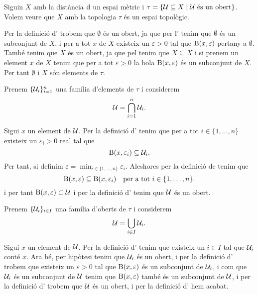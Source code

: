 \documentclass[../Apunts.tex]{subfiles}
\begin{document}
	\begin{example}
		\label{ex:topologia induida per una mètrica}
		Siguin \(X\) amb la distància \(\operatorname{d}\) un espai mètric i \(\tau=\{\mathcal{U}\subseteq X\mid \mathcal{U}\text{ és un obert}\}\). Volem veure que \(X\) amb la topologia \(\tau\) és un espai topològic.
		\begin{solution}
			Per la definició d' trobem que \(\emptyset\) és un obert, ja que per l' tenim que \(\emptyset\) és un subconjunt de \(X\), i per a tot \(x\) de \(X\) existeix un \(\varepsilon>0\) tal que \(\operatorname{B}(x,\varepsilon)\) pertany a \(\emptyset\). També tenim que \(X\) és un obert, ja que pel  tenim que \(X\subseteq X\) i si prenem un element \(x\) de \(X\) tenim que per a tot \(\varepsilon>0\) la bola \(\operatorname{B}(x,\varepsilon)\) és un subconjunt de \(X\). Per tant \(\emptyset\) i \(X\) són elements de \(\tau\).
			
			Prenem \(\{\mathcal{U}_{i}\}_{i=1}^{n}\) una família d'elements de \(\tau\) i considerem
			\[\mathcal{U}=\bigcap_{i=1}^{n}\mathcal{U}_{i}.\]
			
			Sigui \(x\) un element de \(\mathcal{U}\). Per la definició d' tenim que per a tot \(i\in\{1,\dots,n\}\) existeix un \(\varepsilon_{i}>0\) real tal que
			\[\operatorname{B}(x,\varepsilon_{i})\subseteq\mathcal{U}_{i}.\]
			Per tant, si definim \(\varepsilon=\min_{i\in\{1,\dots,n\}}\varepsilon_{i}\). Aleshores per la definició de  tenim que
			\[\operatorname{B}(x,\varepsilon)\subseteq\operatorname{B}(x,\varepsilon_{i})\quad\text{per a tot }i\in\{1,\dots,n\}.\]
			i per tant \(\operatorname{B}(x,\varepsilon)\subset\mathcal{U}\) i per la definició d' tenim que \(\mathcal{U}\) és un obert.
			
			Prenem \(\{\mathcal{U}_{i}\}_{i\in I}\) una família d'oberts de \(\tau\) i considerem
			\[\mathcal{U}=\bigcup_{i\in I}\mathcal{U}_{i}.\]
			
			Sigui \(x\) un element de \(\mathcal{U}\). Per la definició d' tenim que existeix un \(i\in I\) tal que \(\mathcal{U}_{i}\) conté \(x\). Ara bé, per hipòtesi tenim que \(\mathcal{U}_{i}\) és un obert, i per la definició d' trobem que existeix un \(\varepsilon>0\) tal que \(\operatorname{B}(x,\varepsilon)\) és un subconjunt de \(\mathcal{U}_{i}\), i com que \(\mathcal{U}_{i}\) és un subconjunt de \(\mathcal{U}\) tenim que \(\operatorname{B}(x,\varepsilon)\) també és un subconjunt de \(\mathcal{U}\), i per la definició d' trobem que \(\mathcal{U}\) és un obert, i per la definició d' hem acabat.
		\end{solution}
	\end{example}
\end{document}
